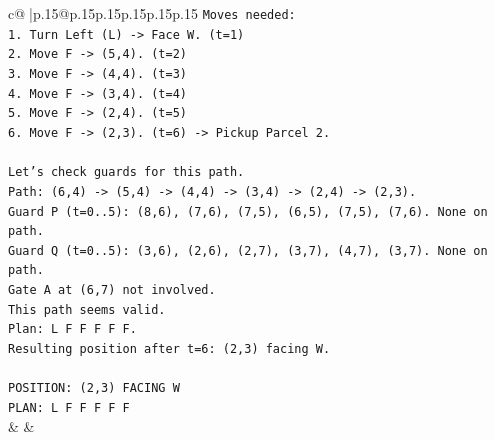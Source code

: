 \documentclass{article}
\begin{document}
{\begin{supertabular}{c@{$\;$}|p{.15\linewidth}@{}p{.15\linewidth}p{.15\linewidth}p{.15\linewidth}p{.15\linewidth}p{.15\linewidth}}
{{{\texttt{Moves needed:} \\
\texttt{1. Turn Left (L) {-}> Face W. (t=1)} \\
\texttt{2. Move F {-}> (5,4). (t=2)} \\
\texttt{3. Move F {-}> (4,4). (t=3)} \\
\texttt{4. Move F {-}> (3,4). (t=4)} \\
\texttt{5. Move F {-}> (2,4). (t=5)} \\
\texttt{6. Move F {-}> (2,3). (t=6) {-}> Pickup Parcel 2.} \\
\\ 
\texttt{Let's check guards for this path.} \\
\texttt{Path: (6,4) {-}> (5,4) {-}> (4,4) {-}> (3,4) {-}> (2,4) {-}> (2,3).} \\
\texttt{Guard P (t=0..5): (8,6), (7,6), (7,5), (6,5), (7,5), (7,6). None on path.} \\
\texttt{Guard Q (t=0..5): (3,6), (2,6), (2,7), (3,7), (4,7), (3,7). None on path.} \\
\texttt{Gate A at (6,7) not involved.} \\
\texttt{This path seems valid.} \\
\texttt{Plan: L F F F F F.} \\
\texttt{Resulting position after t=6: (2,3) facing W.} \\
\\ 
\texttt{POSITION: (2,3) FACING W} \\
\texttt{PLAN: L F F F F F} \\
            }
        }
    }
    & & \\ \\


\end{supertabular}}
\end{document}
